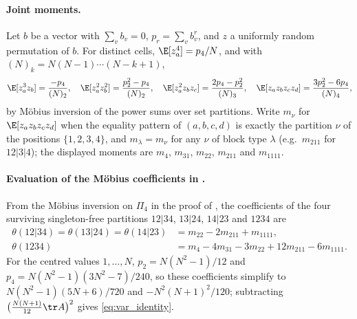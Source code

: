 \paragraph{Joint moments.}
Let $b$ be a vector with $\sum_vb_v=0$, $p_r=\sum_vb_v^r$, and $z$ a uniformly random permutation of $b$.
For distinct cells, $\E[z_a^4]=p_4/N$, and with $(N)_k=N(N-1)\cdots(N-k+1)$,
\[
\E[z_a^3z_b]=\frac{-p_4}{(N)_2},\quad \E[z_a^2z_b^2]=\frac{p_2^2-p_4}{(N)_2},\quad \E[z_a^2z_bz_c]=\frac{2p_4-p_2^2}{(N)_3},\quad \E[z_az_bz_cz_d]=\frac{3p_2^2-6p_4}{(N)_4},
\]
by M\"obius inversion of the power sums over set partitions.
Write $m_\nu$ for $\E[z_az_bz_cz_d]$ when the equality pattern of $(a,b,c,d)$ is exactly the partition $\nu$ of the positions $\{1,2,3,4\}$, and $m_\lambda=m_\nu$ for any $\nu$ of block type $\lambda$ (e.g.\ $m_{211}$ for $12|3|4$); the displayed moments are $m_4$, $m_{31}$, $m_{22}$, $m_{211}$ and $m_{1111}$.

\paragraph{Evaluation of the M\"obius coefficients in .}
From the M\"obius inversion on $\Pi_4$ in the proof of , the coefficients of the four surviving singleton-free partitions $12|34$, $13|24$, $14|23$ and $1234$ are
\[
\begin{aligned}\theta(12|34)=\theta(13|24)=\theta(14|23)&=m_{22}-2m_{211}+m_{1111},\\ \theta(1234)&=m_4-4m_{31}-3m_{22}+12m_{211}-6m_{1111}.\end{aligned}
\]
For the centred values $1,\dots,N$, $p_2=N(N^2-1)/12$ and $p_4=N(N^2-1)(3N^2-7)/240$, so these coefficients simplify to $N(N^2-1)(5N+6)/720$ and $-N^2(N+1)^2/120$; subtracting $\bigl(\frac{N(N+1)}{12}\tr A\bigr)^2$ gives \eqref{eq:var_identity}.


